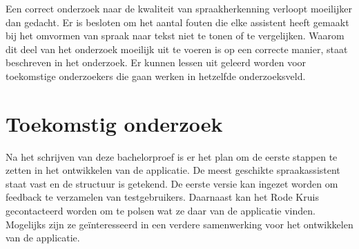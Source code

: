 \documentclass[a0,portrait]{a0poster}
\begin{document}
\begin{multicols}{2}
Een correct onderzoek naar de kwaliteit van spraakherkenning verloopt moeilijker dan gedacht. Er is besloten om het aantal fouten die elke assistent heeft gemaakt bij het omvormen van spraak naar tekst niet te tonen of te vergelijken. Waarom dit deel van het onderzoek moeilijk uit te voeren is op een correcte manier, staat beschreven in het onderzoek. Er kunnen lessen uit geleerd worden voor toekomstige onderzoekers die gaan werken in hetzelfde onderzoeksveld.
\color{HoGentAccent1} 
\section*{Toekomstig onderzoek}
\color{black}

Na het schrijven van deze bachelorproef is er het plan om de eerste stappen te zetten in het ontwikkelen van de applicatie. De meest geschikte spraakassistent staat vast en de structuur is getekend. De eerste versie kan ingezet worden om feedback te verzamelen van testgebruikers. Daarnaast kan het Rode Kruis gecontacteerd worden om te polsen wat ze daar van de applicatie vinden. Mogelijks zijn ze geïnteresseerd in een verdere samenwerking voor het ontwikkelen van de applicatie.



\end{multicols}
\end{document}
